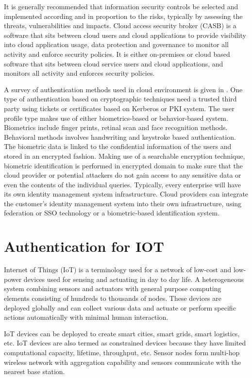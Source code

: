 \begin{multicols}{2}
It is generally recommended that information security controls be selected and implemented according and in proportion to the risks, typically by assessing the threats, vulnerabilities and impacts. Cloud access security broker (CASB) is a software that sits between cloud users and cloud applications to provide visibility into cloud application usage, data protection and governance to monitor all activity and enforce security policies. It is either on-premises or cloud based software that sits between cloud service users and cloud applications, and monitors all activity and enforces security policies. 

A survey of authentication methods used in cloud environment is given in \cite{chap2-key18}. One type of authentication based on cryptographic techniques need a trusted third party using tickets or certificates based on Kerberos or PKI system. The user profile type makes use of either biometrics-based or behavior-based system. Biometrics include finger prints, retinal scan and face recognition methods. Behavioral methods involves handwriting and keystroke based authentication. The biometric data is linked to the confidential information of the users and stored in an encrypted fashion. Making use of a searchable encryption technique, biometric identification is performed in encrypted domain to make sure that the cloud provider or potential attackers do not gain access to any sensitive data or even the contents of the individual queries. Typically, every enterprise will have its own identity management system infrastructure. Cloud providers can integrate the customer's identity management system into their own infrastructure, using federation or SSO technology or a biometric-based identification system.

\section*{Authentication for IOT}

Internet of Things (IoT) is a terminology used for a network of low-cost and low-power devices used for sensing and actuating in day to day life. A heterogeneous system combining sensors and actuators with general purpose computing elements consisting of hundreds to thousands of nodes. These devices are deployed globally and can collect various data and actuate or perform specific actions automatically with minimal human interaction.

IoT devices can be deployed to create smart cities, smart grids, smart logistics, etc. IoT devices are also termed as constrained devices because they have limited computational capacity, lifetime, throughput, etc. Sensor nodes form multi-hop wireless network with aggregation capability and sensors communicate with the nearest base station. 


\end{multicols}
